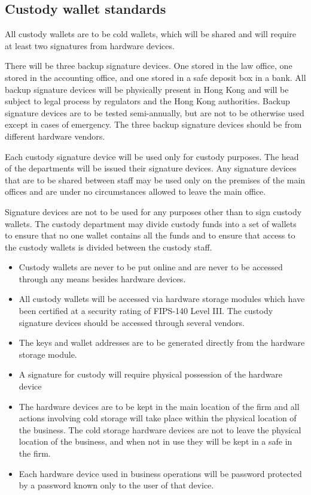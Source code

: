 \subsection{Custody wallet standards}

All custody wallets are to be cold wallets, which will be shared and
will require at least two signatures from hardware devices.

There will be three backup signature devices.  One stored in the law
office, one stored in the accounting office, and one stored in a
safe deposit box in a bank.  All backup signature devices will be
physically present in Hong Kong and will be subject to legal process
by regulators and the Hong Kong authorities.  Backup signature devices
are to be tested semi-annually, but are not to be otherwise used except
in cases of emergency.  The three backup signature devices should be
from different hardware vendors.

Each custody signature device will be used only for custody purposes.
The head of the departments will be issued their signature
devices.  Any signature devices that are to be shared between staff
may be used only on the premises of the main offices and are under no
circumstances allowed to leave the main office.

Signature devices are not to be used for any purposes other than to
sign custody wallets.  The custody department may divide custody funds
into a set of wallets to ensure that no one wallet contains all the
funds and to ensure that access to the custody wallets is divided
between the custody staff.

\begin{itemize}
  \item Custody wallets are never to be put online and are never to be
    accessed through any means besides hardware devices.
  \item All custody wallets will be accessed via hardware storage
    modules which have been certified at a security rating of
    FIPS-140 Level III.  The custody signature devices should be
    accessed through several vendors.
 \item The keys and wallet addresses are to be generated directly from
   the hardware storage module.
 \item A signature for custody will require physical possession
   of the hardware device
 \item The hardware devices are to be kept in the main location of the
   firm and all actions involving cold storage will take place within
   the physical location of the business.  The cold storage hardware
   devices are not to leave the physical location of the business, and
   when not in use they will be kept in a safe in the firm.
 \item Each hardware device used in business operations will be
   password protected by a password known only to the user of that
   device.
\end{itemize}

